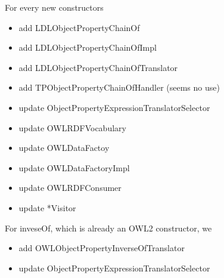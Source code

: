\documentclass{article}
\begin{document}
	For every new constructors
	
	\begin{itemize}
      \item add LDLObjectPropertyChainOf
      \item add LDLObjectPropertyChainOfImpl
      \item add LDLObjectPropertyChainOfTranslator 
      \item add TPObjectPropertyChainOfHandler (seems no use)
      \item update ObjectPropertyExpressionTranslatorSelector
      \item update OWLRDFVocabulary
      \item update OWLDataFactoy
      \item update OWLDataFactoryImpl
      \item update OWLRDFConsumer      
      \item update *Visitor
    \end{itemize}
	
	For inveseOf, which is already an OWL2 constructor, we 	
	\begin{itemize}
      \item add OWLObjectPropertyInverseOfTranslator
      \item update ObjectPropertyExpressionTranslatorSelector
    \end{itemize}
	
	
	\section{}
	
	
\end{document}
